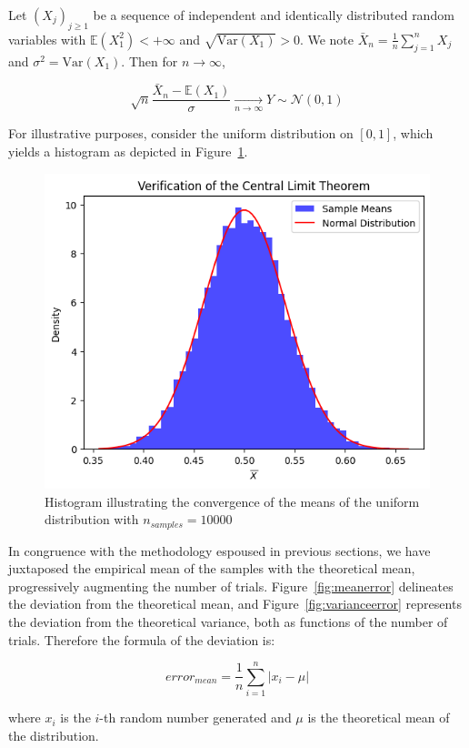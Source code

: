 \documentclass{article}
\begin{document}
\begin{theorem}
	Let $(X_j)_{j \geq 1}$ be a sequence of independent and identically distributed random variables with $\mathbb{E}(X_1^2) < + \infty$ and $\sqrt{\mathrm{Var}(X_1)} > 0$. We note $\bar{X}_n = \frac{1}{n} \sum_{j=1}^n X_j$ and $\sigma^2 = \mathrm{Var}(X_1)$. Then for $n \to \infty$,

	\begin{equation}
		\sqrt{n} \frac{\bar{X}_n - \mathbb{E}(X_1)}{\sigma} \xrightarrow[n \to \infty]{} Y \sim  \mathcal{N}(0,1)
	\end{equation}
\end{theorem}

For illustrative purposes, consider the uniform distribution on \([0,1]\), which yields a histogram as depicted in Figure~\ref{fig:verificationclt}.

\begin{figure}[H]
	\centering
	\includegraphics[width=0.5\linewidth]{./Figures/CLT/verif.png}
	\caption{Histogram illustrating the convergence of the means of the uniform distribution with $n_{samples} = 10000$}
	\label{fig:verificationclt}
\end{figure}

In congruence with the methodology espoused in previous sections, we have juxtaposed the empirical mean of the samples with the theoretical mean, progressively augmenting the number of trials. Figure~\ref{fig:meanerror} delineates the deviation from the theoretical mean, and Figure~\ref{fig:varianceerror} represents the deviation from the theoretical variance, both as functions of the number of trials. Therefore the formula of the deviation is:

\begin{equation*} error_{mean} = \frac{1}{n}\sum_{i=1}^{n} | x_i - \mu | \end{equation*}

where \(x_i\) is the \(i\)-th random number generated and \(\mu\) is the theoretical mean of the distribution.
\end{document}
